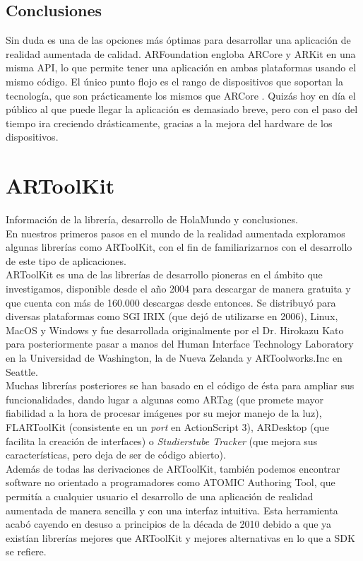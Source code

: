\subsection{Conclusiones}
Sin duda es una de las opciones más óptimas para desarrollar una aplicación de realidad aumentada de calidad. ARFoundation engloba ARCore y ARKit en una misma API, lo que permite tener una aplicación en ambas plataformas usando el mismo código. El único punto flojo es el rango de dispositivos que soportan la tecnología, que son prácticamente los mismos que ARCore \cite{ARCoreList}. Quizás hoy en día el público al que puede llegar la aplicación es demasiado breve, pero con el paso del tiempo ira creciendo drásticamente, gracias a la mejora del hardware de los dispositivos.

\clearpage
\section{ARToolKit}
Información de la librería, desarrollo de HolaMundo y conclusiones.\\
En nuestros primeros pasos en el mundo de la realidad aumentada exploramos algunas librerías como ARToolKit, con el fin de familiarizarnos con el desarrollo de este tipo de aplicaciones.\\

ARToolKit es una de las librerías de desarrollo pioneras en el ámbito que investigamos, disponible desde el año 2004 para descargar de manera gratuita y que cuenta con más de 160.000 descargas desde entonces. Se distribuyó para diversas plataformas como SGI IRIX (que dejó de utilizarse en 2006), Linux, MacOS y Windows y fue desarrollada originalmente por el Dr. Hirokazu Kato para posteriormente pasar a manos del Human Interface Technology Laboratory en la Universidad de Washington, la de Nueva Zelanda y ARToolworks.Inc en Seattle.\\

Muchas librerías posteriores se han basado en el código de ésta para ampliar sus funcionalidades, dando lugar a algunas como ARTag (que promete mayor fiabilidad a la hora de procesar imágenes por su mejor manejo de la luz), FLARToolKit (consistente en un \textit{port} en ActionScript 3), ARDesktop (que facilita la creación de interfaces) o\textit{ Studierstube Tracker} (que mejora sus características, pero deja de ser de código abierto).\\
Además de todas las derivaciones de ARToolKit, también podemos encontrar software no orientado a programadores como ATOMIC Authoring Tool, que permitía a cualquier usuario el desarrollo de una aplicación de realidad aumentada de manera sencilla y con una interfaz intuitiva. Esta herramienta acabó cayendo en desuso a principios de la década de 2010 debido a que ya existían librerías mejores que ARToolKit y mejores alternativas en lo que a SDK se refiere.\\

